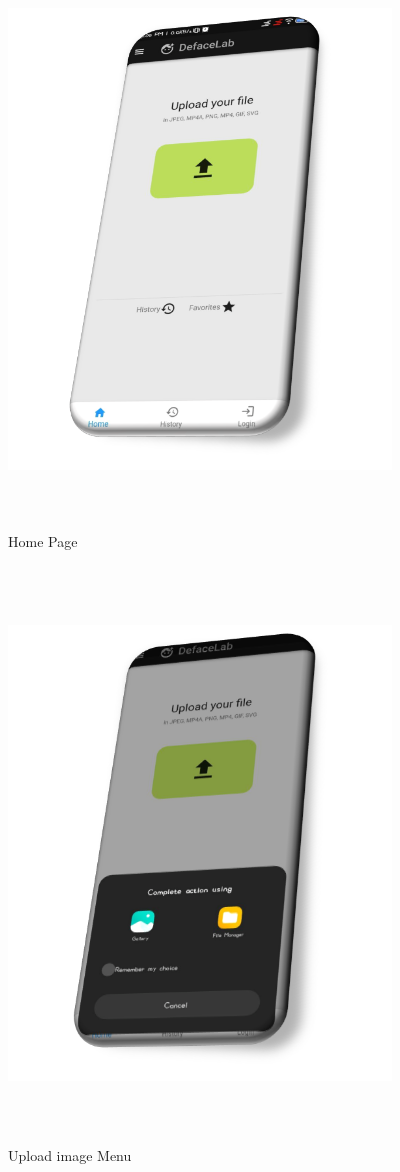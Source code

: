 \begin{figure}[ht]
    \centering
    \includegraphics[width= 4in,height =6in ]{img/homepagev2.png}
    \caption{Home Page}
\end{figure}

\begin{figure}[ht]
    \centering
    \includegraphics[width= 4in,height =6in ]{img/uploaderv2.png}
    \caption{Upload image Menu}
\end{figure}

